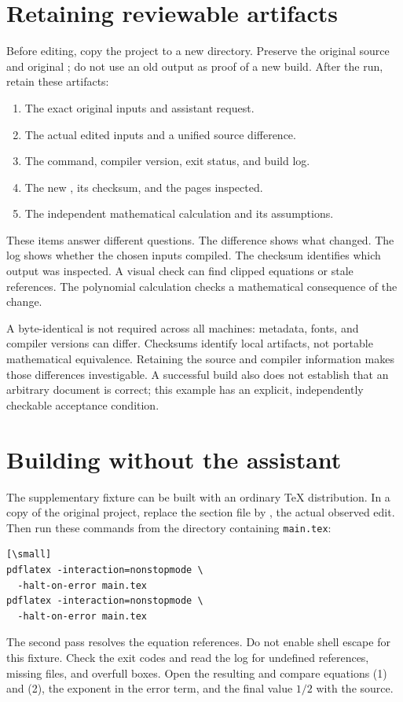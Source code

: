 \documentclass{ltugboat}
\begin{document}
\section{Retaining reviewable artifacts}
Before editing, copy the project to a new directory. Preserve the
original source and original ; do not use an old output as
proof of a new build. After the run, retain these artifacts:
\begin{enumerate}
\item The exact original inputs and assistant request.
\item The actual edited inputs and a unified source difference.
\item The command, compiler version, exit status, and build log.
\item The new , its checksum, and the pages inspected.
\item The independent mathematical calculation and its assumptions.
\end{enumerate}
These items answer different questions. The difference shows what
changed. The log shows whether the chosen inputs compiled. The
checksum identifies which output was inspected. A visual check can
find clipped equations or stale references. The polynomial calculation
checks a mathematical consequence of the change.

A byte-identical  is not required across all machines:
metadata, fonts, and compiler versions can differ. Checksums identify
local artifacts, not portable mathematical equivalence. Retaining the
source and compiler information makes those differences investigable.
A successful build also does not establish that an arbitrary document
is correct; this example has an explicit, independently checkable
acceptance condition.

\section{Building without the assistant}
The supplementary fixture can be built with an ordinary \TeX{}
distribution. In a copy of the original project, replace the section
file by , the actual observed edit. Then run
these commands from the directory containing \texttt{main.tex}:
\begin{verbatim}[\small]
pdflatex -interaction=nonstopmode \
  -halt-on-error main.tex
pdflatex -interaction=nonstopmode \
  -halt-on-error main.tex
\end{verbatim}
The second pass resolves the equation references. Do not enable shell
escape for this fixture. Check the exit codes and read the log for
undefined references, missing files, and overfull boxes. Open the
resulting \acro{PDF} and compare equations (1) and (2), the exponent in
the error term, and the final value $1/2$ with the source.
\end{document}
